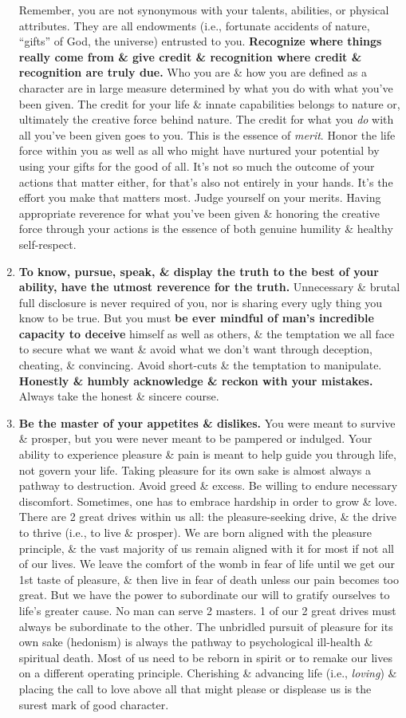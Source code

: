 \documentclass{article}
\numberwithin{equation}{section}
\begin{document}
\begin{enumerate}
	Remember, you are not synonymous with your talents, abilities, or physical attributes. They are all endowments (i.e., fortunate accidents of nature, ``gifts'' of God, the universe) entrusted to you. \textbf{Recognize where things really come from \& give credit \& recognition where credit \& recognition are truly due.} Who you are \& how you are defined as a character are in large measure determined by what you do with what you've been given. The credit for your life \& innate capabilities belongs to nature or, ultimately the creative force behind nature. The credit for what you \textit{do} with all you've been given goes to you. This is the essence of \textit{merit}. Honor the life force within you as well as all who might have nurtured your potential by using your gifts for the good of all. It's not so much the outcome of your actions that matter either, for that's also not entirely in your hands. It's the effort you make that matters most. Judge yourself on your merits. Having appropriate reverence for what you've been given \& honoring the creative force through your actions is the essence of both genuine humility \& healthy self-respect.
	\item \textbf{To know, pursue, speak, \& display the truth to the best of your ability, have the utmost reverence for the truth.} Unnecessary \& brutal full disclosure is never required of you, nor is sharing every ugly thing you know to be true. But you must \textbf{be ever mindful of man's incredible capacity to deceive} himself as well as others, \& the temptation we all face to secure what we want \& avoid what we don't want through deception, cheating, \& convincing. Avoid short-cuts \& the temptation to manipulate. \textbf{Honestly \& humbly acknowledge \& reckon with your mistakes.} Always take the honest \& sincere course.
	\item \textbf{Be the master of your appetites \& dislikes.} You were meant to survive \& prosper, but you were never meant to be pampered or indulged. Your ability to experience pleasure \& pain is meant to help guide you through life, not govern your life. Taking pleasure for its own sake is almost always a pathway to destruction. Avoid greed \& excess. Be willing to endure necessary discomfort. Sometimes, one has to embrace hardship in order to grow \& love. There are 2 great drives within us all: the pleasure-seeking drive, \& the drive to thrive (i.e., to live \& prosper). We are born aligned with the pleasure principle, \& the vast majority of us remain aligned with it for most if not all of our lives. We leave the comfort of the womb in fear of life until we get our 1st taste of pleasure, \& then live in fear of death unless our pain becomes too great. But we have the power to subordinate our will to gratify ourselves to life's greater cause. No man can serve 2 masters. 1 of our 2 great drives must always be subordinate to the other. The unbridled pursuit of pleasure for its own sake (hedonism) is always the pathway to psychological ill-health \& spiritual death. Most of us need to be reborn in spirit or to remake our lives on a different operating principle. Cherishing \& advancing life (i.e., \textit{loving}) \& placing the call to love above all that might please or displease us is the surest mark of good character.

\end{enumerate}
\end{document}
